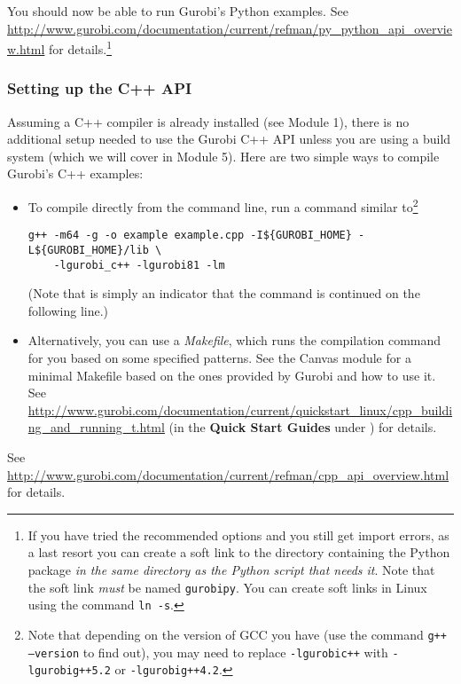 \documentclass[12pt]{article}
\begin{document}
You should now be able to run Gurobi's Python examples.
See \url{http://www.gurobi.com/documentation/current/refman/py_python_api_overview.html} for details.\footnote{
    If you have tried the recommended options and you still get import errors, as a last resort you can create a soft link to the directory containing the Python package \emph{in the same directory as the Python script that needs it}.
    Note that the soft link \emph{must} be named \texttt{gurobipy}.
    You can create soft links in Linux using the command \texttt{ln -s}.
}

\subsubsection{Setting up the C++ API}
Assuming a C++ compiler is already installed (see Module 1), there is no additional setup needed to use the Gurobi C++ API unless you are using a build system (which we will cover in Module 5).
Here are two simple ways to compile Gurobi's C++ examples:
\begin{itemize}
    \item To compile directly from the command line, run a command similar to\footnote{
        Note that depending on the version of GCC you have (use the command \texttt{g++ --version} to find out), you may need to replace \texttt{-lgurobi\ttul c++} with \texttt{-lgurobi\ttul g++5.2} or \texttt{-lgurobi\ttul g++4.2}.
        }
\begin{verbatim}
g++ -m64 -g -o example example.cpp -I${GUROBI_HOME} -L${GUROBI_HOME}/lib \
    -lgurobi_c++ -lgurobi81 -lm
\end{verbatim}
        (Note that \texttt{} is simply an indicator that the command is continued on the following line.)
    \item Alternatively, you can use a \emph{Makefile}, which runs the compilation command for you based on some specified patterns.
        See the Canvas module for a minimal Makefile based on the ones provided by Gurobi and how to use it.
        See \url{http://www.gurobi.com/documentation/current/quickstart_linux/cpp_building_and_running_t.html} (in the \textbf{Quick Start Guides} under ) for details.
\end{itemize}
See \url{http://www.gurobi.com/documentation/current/refman/cpp_api_overview.html} for details.
\end{document}
